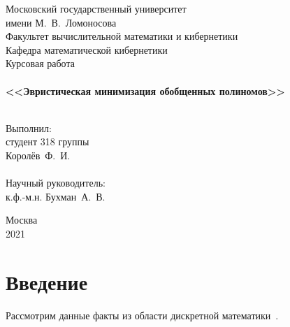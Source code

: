 \documentclass[a4paper,12pt,titlepage,finall]{article}
\begin{document}
\begin{titlepage}
    \begin{center}
	{\small \sc Московский государственный университет \\имени М.~В.~Ломоносова\\
	Факультет вычислительной математики и кибернетики\\Кафедра математической кибернетики\\}
	\vfill
	{\Large \sc Курсовая работа}\\
    ~\\
	{\large \bf <<Эвристическая минимизация обобщенных полиномов>>}\\
	~\\
    \end{center}
    \begin{flushright}
	\vfill {Выполнил:\\
	студент 318 группы\\
	Королёв~Ф.~И.\\
	~\\
	Научный руководитель:\\
	к.ф.-м.н. Бухман~А.~В.}
    \end{flushright}
    \begin{center}
	\vfill
	{\small Москва\\2021}
    \end{center}
\end{titlepage}

\tableofcontents
\newpage

\section{Введение}

Рассмотрим данные факты из области дискретной математики~\cite{discrete}.
\end{document}
